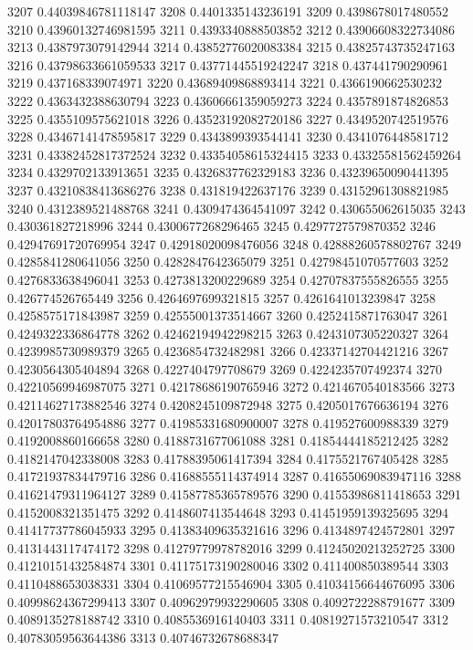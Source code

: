 3207 0.44039846781118147
3208 0.4401335143236191
3209 0.4398678017480552
3210 0.43960132746981595
3211 0.4393340888503852
3212 0.43906608322734086
3213 0.4387973079142944
3214 0.43852776020083384
3215 0.43825743735247163
3216 0.43798633661059533
3217 0.43771445519242247
3218 0.437441790290961
3219 0.437168339074971
3220 0.43689409868893414
3221 0.4366190662530232
3222 0.4363432388630794
3223 0.43606661359059273
3224 0.4357891874826853
3225 0.4355109575621018
3226 0.43523192082720186
3227 0.4349520742519576
3228 0.43467141478595817
3229 0.4343899393544141
3230 0.4341076448581712
3231 0.43382452817372524
3232 0.43354058615324415
3233 0.43325581562459264
3234 0.4329702133913651
3235 0.4326837762329183
3236 0.43239650090441395
3237 0.43210838413686276
3238 0.431819422637176
3239 0.43152961308821985
3240 0.4312389521488768
3241 0.4309474364541097
3242 0.430655062615035
3243 0.430361827218996
3244 0.4300677268296465
3245 0.4297727579870352
3246 0.42947691720769954
3247 0.42918020098476056
3248 0.42888260578802767
3249 0.4285841280641056
3250 0.4282847642365079
3251 0.42798451070577603
3252 0.4276833638496041
3253 0.4273813200229689
3254 0.42707837555826555
3255 0.426774526765449
3256 0.4264697699321815
3257 0.4261641013239847
3258 0.4258575171843987
3259 0.42555001373514667
3260 0.4252415871763047
3261 0.4249322336864778
3262 0.42462194942298215
3263 0.4243107305220327
3264 0.4239985730989379
3265 0.4236854732482981
3266 0.42337142704421216
3267 0.4230564305404894
3268 0.4227404797708679
3269 0.4224235707492374
3270 0.42210569946987075
3271 0.42178686190765946
3272 0.4214670540183566
3273 0.42114627173882546
3274 0.4208245109872948
3275 0.4205017676636194
3276 0.42017803764954886
3277 0.41985331680900007
3278 0.419527600988339
3279 0.4192008860166658
3280 0.4188731677061088
3281 0.41854444185212425
3282 0.4182147042338008
3283 0.41788395061417394
3284 0.4175521767405428
3285 0.41721937834479716
3286 0.41688555114374914
3287 0.41655069083947116
3288 0.41621479311964127
3289 0.41587785365789576
3290 0.41553986811418653
3291 0.4152008321351475
3292 0.4148607413544648
3293 0.41451959139325695
3294 0.41417737786045933
3295 0.41383409635321616
3296 0.4134897424572801
3297 0.4131443117474172
3298 0.41279779978782016
3299 0.41245020213252725
3300 0.41210151432584874
3301 0.41175173190280046
3302 0.411400850389544
3303 0.4110488653038331
3304 0.41069577215546904
3305 0.41034156644676095
3306 0.40998624367299413
3307 0.40962979932290605
3308 0.4092722288791677
3309 0.4089135278188742
3310 0.4085536916140403
3311 0.40819271573210547
3312 0.40783059563644386
3313 0.40746732678688347
